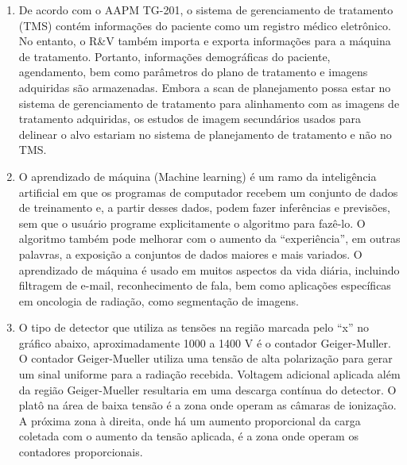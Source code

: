 \documentclass[11pt,a4paper]{article}
\begin{document}
\begin{enumerate}
        \item De acordo com o AAPM TG-201, o sistema de gerenciamento de tratamento (TMS) contém informações do paciente como um registro médico eletrônico. No entanto, o R\&V também importa e exporta informações para a máquina de tratamento. Portanto, informações demográficas do paciente, agendamento, bem como parâmetros do plano de tratamento e imagens adquiridas são armazenadas. Embora a scan de planejamento possa estar no sistema de gerenciamento de tratamento para alinhamento com as imagens de tratamento adquiridas, os estudos de imagem secundários usados para delinear o alvo estariam no sistema de planejamento de tratamento e não no TMS.

        \item O aprendizado de máquina (Machine learning) é um ramo da inteligência artificial em que os programas de computador recebem um conjunto de dados de treinamento e, a partir desses dados, podem fazer inferências e previsões, sem que o usuário programe explicitamente o algoritmo para fazê-lo. O algoritmo também pode melhorar com o aumento da “experiência”, em outras palavras, a exposição a conjuntos de dados maiores e mais variados. O aprendizado de máquina é usado em muitos aspectos da vida diária, incluindo filtragem de e-mail, reconhecimento de fala, bem como aplicações específicas em oncologia de radiação, como segmentação de imagens.
        
        \item O tipo de detector que utiliza as tensões na região marcada pelo “x” no gráfico abaixo, aproximadamente 1000 a 1400 V é o contador Geiger-Muller. O contador Geiger-Mueller utiliza uma tensão de alta polarização para gerar um sinal uniforme para a radiação recebida. Voltagem adicional aplicada além da região Geiger-Mueller resultaria em uma descarga contínua do detector. O platô na área de baixa tensão é a zona onde operam as câmaras de ionização. A próxima zona à direita, onde há um aumento proporcional da carga coletada com o aumento da tensão aplicada, é a zona onde operam os contadores proporcionais.
        
        \begin{center}
        \end{center}


\end{enumerate}
\end{document}
